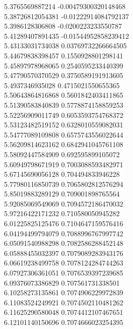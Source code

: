 {5.3765569887214 -0.00479300320148468 \\
5.38726812054381 -0.01222914084792137 \\
5.3986128306808 -0.0200223233550787 \\
5.41289407891435 -0.01544952858239412 \\
5.43133031734038 0.03769732266664505 \\
5.44679838398457 0.1550928801298141 \\
5.45897978968065 0.2540595233440399 \\
5.47790570370529 0.3750589191913605 \\
5.4937346935028 0.4715021550655365 \\
5.50643864816868 0.5601842403411865 \\
5.51390583840839 0.5778874158859253 \\
5.52256909011749 0.6053593754768372 \\
5.53123482519152 0.6328010559082031 \\
5.54777089109808 0.6575743556022644 \\
5.56209814623162 0.6842941045761108 \\
5.58092447584909 0.692595899105072 \\
5.60949798671919 0.7003088593482971 \\
5.67145690056128 0.704494833946228 \\
5.77980116850739 0.7065802812576294 \\
5.85019883289129 0.709001898765564 \\
5.92085069549069 0.7094572186470032 \\
5.97216422171232 0.710580050945282 \\
6.01225825125476 0.7104647159576416 \\
6.04194499794079 0.7088996767997742 \\
6.05091540988298 0.7082586288452148 \\
6.05888455032397 0.7079089283943176 \\
6.06619238499758 0.7078124284744263 \\
6.07927306361051 0.7076539397239685 \\
6.09376073386829 0.707561731338501 \\
6.10258273135861 0.7074906229972839 \\
6.11083524249921 0.7074502110481262 \\
6.11625290580048 0.7074412107467651 \\
6.12101140150696 0.7074666023254395 \\
}
